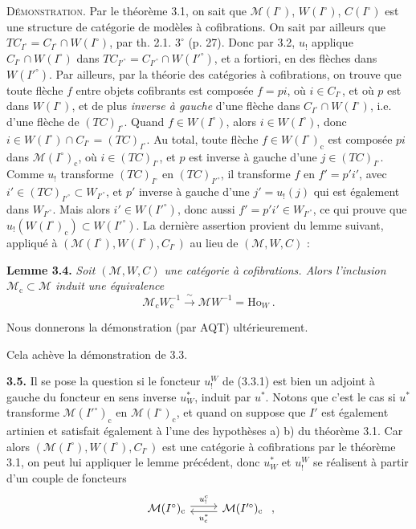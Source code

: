 \documentclass[11pt]{article}
\newcommand{\msp}[1]{\ifstrequal{#1}{page 1}{}{\marginpar{\footnotesize [#1]}}}
\begin{document}
\textsc{Démonstration}. Par le théorème 3.1, on sait que $\mathcal{M}(I^\circ)$, $W(I^\circ)$, $C(I^\circ)$ est une structure de catégorie de modèles à cofibrations. On sait par ailleurs que $TC_{I^\circ}=C_{I^\circ}\cap W(I^\circ)$, par th. 2.1. $3^\circ$ (p. 27). Donc par 3.2, $u_!$ applique $C_{I^\circ}\cap W(I^\circ)$ dans $TC_{I'^\circ}=C_{I'^\circ}\cap W(I'^\circ)$, et a fortiori, en des flèches dans $W(I'^\circ)$. Par ailleurs, par la théorie des catégories à cofibrations, on trouve que toute flèche $f$ entre objets cofibrants est composée $f=pi$, où $i\in C_{I^\circ}$, et où $p$ est dans $W(I^\circ)$, et de plus \textit{inverse à gauche} d'une flèche dans $C_{I^\circ}\cap W(I^\circ)$, i.e. d'une flèche de $(TC)_{I^\circ}$. Quand
\msp{56}
$f\in W(I^\circ)$, alors $i\in W(I^\circ)$, donc $i\in W(I^\circ)\cap C_{I^\circ}=(TC)_{I^\circ}$. Au total, toute flèche $f\in W(I^\circ)_{\mathrm{c}}$ est composée $pi$ dans $\mathcal{M}(I^\circ)_{\mathrm{c}}$, où $i\in(TC)_{I^\circ}$, et $p$ est inverse à gauche d'une $j\in(TC)_{I^\circ}$. Comme $u_!$ transforme $(TC)_{I^\circ}$ en $(TC)_{I'^\circ}$, il transforme $f$ en $f'=p'i'$, avec $i'\in(TC)_{I'^\circ}\subset W_{I'^\circ}$, et $p'$ inverse à gauche d'une $j'=u_!(j)$ qui est également dans $W_{I'^\circ}$. Mais alors $i'\in W(I'^\circ)$, donc aussi $f'=p'i'\in W_{I'^\circ}$, ce qui prouve que $u_!(W(I^\circ)_{\mathrm{c}})\subset W(I'^\circ)$. La dernière assertion provient du lemme suivant, appliqué à $(\mathcal{M}(I^\circ),W(I^\circ),C_{I^\circ})$ au lieu de $(\mathcal{M},W,C)$ :

\textbf{Lemme 3.4.} \textit{Soit $(\mathcal{M},W,C)$ une catégorie à cofibrations. Alors l'inclusion $\mathcal{M}_{\mathrm{c}}\subset\mathcal{M}$ induit une équivalence}
\[
\mathcal{M}_{\mathrm{c}}W_{\mathrm{c}}^{-1} \xrightarrow{\ \sim\ } \mathcal{M}W^{-1}=\mathrm{Ho}_W\ .
\]

Nous donnerons la démonstration (par AQT) ultérieurement.

Cela achève la démonstration de 3.3.

\textbf{3.5.} Il se pose la question si le foncteur $u_!^W$ de (3.3.1) est bien un adjoint à gauche
\msp{57}
du foncteur en sens inverse $u^*_W$, induit par $u^*$. Notons que c'est le cas si $u^*$ transforme $\mathcal{M}(I'^\circ)_{\mathrm{c}}$ en $\mathcal{M}(I^\circ)_{\mathrm{c}}$, et quand on suppose que $I'$ est également artinien et satisfait également à l'une des hypothèses a) b) du théorème 3.1. Car alors $(\mathcal{M}(I^\circ),W(I^\circ),C_{I^\circ})$ est une catégorie à cofibrations par le théorème 3.1, on peut lui appliquer le lemme précédent, donc $u^*_W$ et $u_!^W$ se réalisent à partir d'un couple de foncteurs
\[
\begin{tikzcd}
\mathcal{M}(I^\circ)_{\mathrm{c}} \arrow[r, shift left, "u_{!}^{\mathrm{c}}"] & \mathcal{M}(I'^\circ)_{\mathrm{c}} \arrow[l, shift left, "u_{\mathrm{c}}^*"]
\end{tikzcd}\ ,
\]
\end{document}
